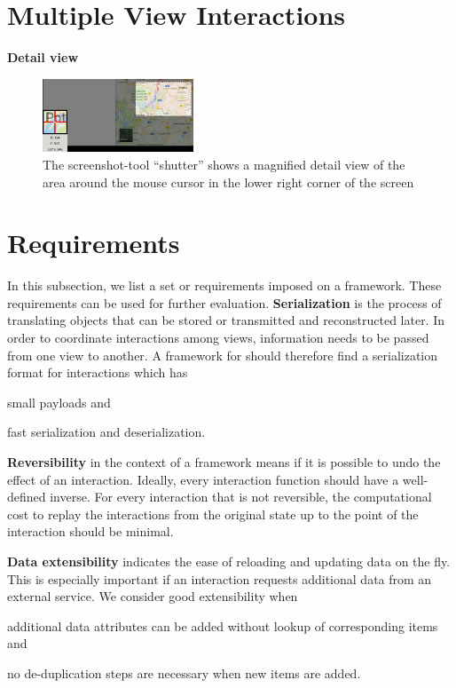 \section{Multiple View Interactions}\label{sec:analysis:examples:multiple}

\textbf{Detail view}
\begin{figure}
  \centering
  \includegraphics[width=0.4\textwidth]{images/chartTypes/multi/detail-view}
  \caption{The screenshot-tool ``shutter'' shows a magnified detail view of the area around the mouse cursor in the lower right corner of the screen}\label{fig:concept:chart-types:detail}
\end{figure}

\section{Requirements}
In this subsection, we list a set or requirements imposed on a \cmv{} framework.
These requirements can be used for further evaluation.
\textbf{Serialization} is the process of translating objects that can be stored or transmitted and reconstructed later.
In order to coordinate interactions among views, information needs to be passed from one view to another. 
A framework for \cmvs{} should therefore find a serialization format for interactions which has
\begin{enumerate*}[label=(\arabic*)]
  \item
    small payloads and
  \item 
    fast serialization and deserialization.
\end{enumerate*}

\textbf{Reversibility} in the context of a \cmv{} framework means if it is possible to undo the effect of an interaction.
Ideally, every interaction function should have a well-defined inverse.
For every interaction that is not reversible, the computational cost to replay the interactions from the original state up to the point of the interaction should be minimal.

\textbf{Data extensibility} indicates the ease of reloading and updating data on the fly.
This is especially important if an interaction requests additional data from an external service.
We consider good extensibility when
\begin{enumerate*}[label=(\arabic*)]
  \item
    additional data attributes can be added without lookup of corresponding items and
  \item
    no de-duplication steps are necessary when new items are added.
\end{enumerate*}

